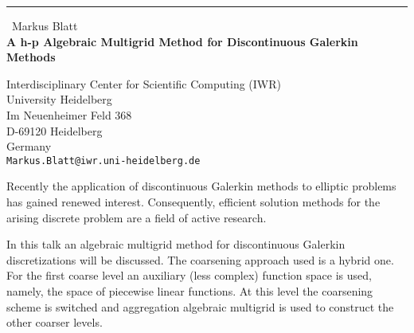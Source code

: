 \documentclass{report}
\begin{document}
\begin{center}
\rule{6in}{1pt} \
{\large Markus Blatt \\
{\bf A h-p Algebraic Multigrid Method for Discontinuous Galerkin Methods }}

Interdisciplinary Center for Scientific Computing (IWR) \\ University Heidelberg \\ Im Neuenheimer Feld 368 \\ D-69120 Heidelberg \\ Germany
\\
{\tt Markus.Blatt@iwr.uni-heidelberg.de}\end{center}

Recently the application of discontinuous Galerkin methods to elliptic
problems has gained renewed interest. Consequently, efficient solution
methods for the arising discrete problem are a field of active research.

In this talk an algebraic multigrid method for discontinuous Galerkin
discretizations will be discussed. The coarsening approach used is a
hybrid one. For the first coarse level an auxiliary (less complex)
function space is used, namely, the space of piecewise linear functions.
At this level the coarsening scheme is switched and aggregation algebraic
multigrid is used to construct the other coarser levels.
\end{document}
